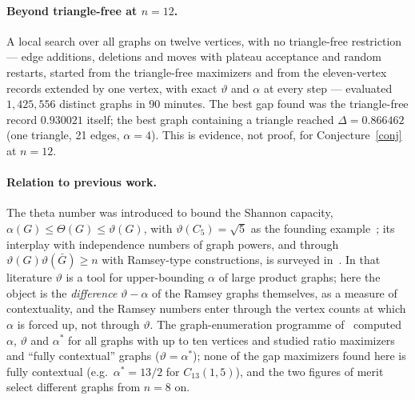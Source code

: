 \documentclass[11pt]{article}
\renewcommand{\theta}{\vartheta}
\newcommand{\gap}{\Delta}
\begin{document}
\paragraph{Beyond triangle-free at $n=12$.} A local search over all graphs on twelve vertices, with no triangle-free restriction --- edge additions, deletions and moves with plateau acceptance and random restarts, started from the triangle-free maximizers and from the eleven-vertex records extended by one vertex, with exact $\theta$ and $\alpha$ at every step --- evaluated $1{,}425{,}556$ distinct graphs in 90 minutes. The best gap found was the triangle-free record $0.930021$ itself; the best graph containing a triangle reached $\gap=0.866462$ (one triangle, 21 edges, $\alpha=4$). This is evidence, not proof, for Conjecture~\ref{conj} at $n=12$.

\paragraph{Relation to previous work.} The theta number was introduced to bound the Shannon capacity, $\alpha(G)\le\Theta(G)\le\theta(G)$, with $\theta(C_5)=\sqrt5$ as the founding example~\cite{lovasz1979}; its interplay with independence numbers of graph powers, and through $\theta(G)\theta(\bar G)\ge n$ with Ramsey-type constructions, is surveyed in~\cite{alon}. In that literature $\theta$ is a tool for upper-bounding $\alpha$ of large product graphs; here the object is the \emph{difference} $\theta-\alpha$ of the Ramsey graphs themselves, as a measure of contextuality, and the Ramsey numbers enter through the vertex counts at which $\alpha$ is forced up, not through $\theta$. The graph-enumeration programme of~\cite{cabello2013basic,canas2016} computed $\alpha$, $\theta$ and $\alpha^*$ for all graphs with up to ten vertices and studied ratio maximizers and ``fully contextual'' graphs ($\theta=\alpha^*$); none of the gap maximizers found here is fully contextual (e.g.\ $\alpha^*=13/2$ for $C_{13}(1,5)$), and the two figures of merit select different graphs from $n=8$ on.
\end{document}
